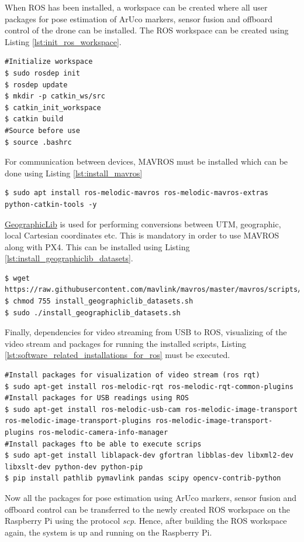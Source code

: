 \documentclass[../Head/report.tex]{subfiles}
\begin{document}
When ROS has been installed, a workspace can be created where all user packages for pose estimation of ArUco markers, sensor fusion and offboard control of the drone can be installed. The ROS workspace can be created using Listing \ref{lst:init_ros_workspace}. 

\begin{lstlisting}[frame=none, caption={Initiating ROS workspace},label=lst:init_ros_workspace]
#Initialize workspace
$ sudo rosdep init
$ rosdep update
$ mkdir -p catkin_ws/src
$ catkin_init_workspace 
$ catkin build
#Source before use
$ source .bashrc
\end{lstlisting}

For communication between devices, MAVROS must be installed which can be done using Listing \ref{lst:install_mavros}

\begin{lstlisting}[frame=none, caption={Installation of MAVROS},label=lst:install_mavros]
$ sudo apt install ros-melodic-mavros ros-melodic-mavros-extras python-catkin-tools -y
\end{lstlisting}

\href{https://geographiclib.sourceforge.io/}{GeographicLib} is used for performing conversions between UTM, geographic, local Cartesian coordinates etc. This is mandatory in order to use MAVROS along with PX4. This can be installed using Listing \ref{lst:install_geographiclib_datasets}. 
\begin{lstlisting}[frame=none, caption={Fetching and installation of the geographiclib dataset},label=lst:install_geographiclib_datasets]
$ wget https://raw.githubusercontent.com/mavlink/mavros/master/mavros/scripts/install_geographiclib_datasets.sh
$ chmod 755 install_geographiclib_datasets.sh
$ sudo ./install_geographiclib_datasets.sh
\end{lstlisting}

Finally, dependencies for video streaming from USB to ROS, visualizing of the video stream and packages for running the installed scripts, Listing \ref{lst:software_related_installations_for_ros} must be executed. 

\begin{lstlisting}[frame=none, caption={Installation of ROS ralated software },label=lst:software_related_installations_for_ros]
#Install packages for visualization of video stream (ros rqt)
$ sudo apt-get install ros-melodic-rqt ros-melodic-rqt-common-plugins
#Install packages for USB readings using ROS
$ sudo apt-get install ros-melodic-usb-cam ros-melodic-image-transport ros-melodic-image-transport-plugins ros-melodic-image-transport-plugins ros-melodic-camera-info-manager
#Install packages fto be able to execute scrips
$ sudo apt-get install liblapack-dev gfortran libblas-dev libxml2-dev libxslt-dev python-dev python-pip
$ pip install pathlib pymavlink pandas scipy opencv-contrib-python
\end{lstlisting}

Now all the packages for pose estimation using ArUco markers, sensor fusion and offboard control can be transferred to the newly created ROS workspace on the Raspberry Pi using the protocol \textit{scp}. Hence, after building the ROS workspace again, the system is up and running on the Raspberry Pi.   
\end{document}
